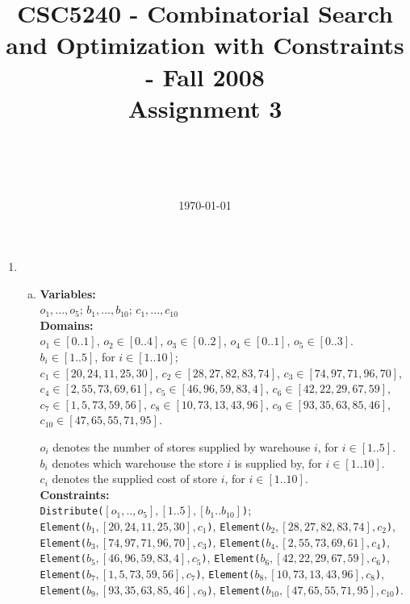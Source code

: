 \documentclass[a4paper,12pt]{article}
\title{CSC5240 - Combinatorial Search and Optimization with
Constraints - Fall 2008\\Assignment 3}
\author{\myname\\\mymail\\\CSE\\\CUHK}
\date{\today}
\begin{document}
\maketitle
\begin{enumerate}[1.]
\item
\begin{enumerate}[(a)]
\item
\textbf{\color{blue}Variables:}\\
$o_1, ... , o_5$;
$b_1, ... , b_{10}$;
$c_1, ... , c_{10}$\\

\textbf{\color{blue}Domains:}\\
$o_1 \in [0..1]$,
$o_2 \in [0..4]$,
$o_3 \in [0..2]$,
$o_4 \in [0..1]$,
$o_5 \in [0..3]$.\\
$b_i \in [1..5]$, for $i \in [1..10]$;\\
$c_1 \in [20,24,11,25,30]$,
$c_2 \in [28,27,82,83,74]$,
$c_3 \in [74,97,71,96,70]$,\\
$c_4 \in [2,55,73,69,61]$,
$c_5 \in [46,96,59,83,4]$,
$c_6 \in [42,22,29,67,59]$,\\
$c_7 \in [1,5,73,59,56]$,
$c_8 \in [10,73,13,43,96]$,
$c_9 \in [93,35,63,85,46]$,\\
$c_{10} \in [47,65,55,71,95]$.

$o_i$ denotes the number of stores supplied by warehouse $i$, for $i\in[1..5]$.\\
$b_i$ denotes which warehouse the store $i$ is supplied by, for $i\in[1..10]$.\\
$c_i$ denotes the supplied cost of store $i$, for $i\in[1..10]$.\\

\textbf{\color{blue}Constraints:}\\
{\tt Distribute($[o_1,..,o_5],[1..5],[b_1..b_{10}]$)};\\
{\tt Element($b_1 , [20,24,11,25,30], c_1$)},
{\tt Element($b_2 , [28,27,82,83,74], c_2$)}, \\
{\tt Element($b_3 , [74,97,71,96,70], c_3$)},
{\tt Element($b_4 , [2,55,73,69,61], c_4$)}, \\
{\tt Element($b_5 , [46,96,59,83,4], c_5$)},
{\tt Element($b_6 , [42,22,29,67,59], c_6$)}, \\
{\tt Element($b_7 , [1,5,73,59,56], c_7$)},
{\tt Element($b_8 , [10,73,13,43,96], c_8$)}, \\
{\tt Element($b_9 , [93,35,63,85,46], c_9$)},
{\tt Element($b_{10} , [47,65,55,71,95], c_{10}$)}.


\end{enumerate}
\end{enumerate}
\end{document}
